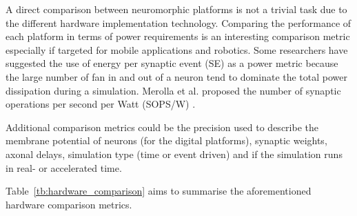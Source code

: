 A direct comparison between neuromorphic platforms is not a trivial task due to the different hardware implementation technology. Comparing the performance of each platform in terms of power requirements is an interesting comparison metric especially if targeted for mobile applications and robotics. Some researchers have suggested the use of energy per synaptic event (SE) \citep{Sharp2012110,strometal} as a power metric because the large number of fan in and out of a neuron tend to dominate the total power dissipation during a simulation. Merolla et al. proposed the number of synaptic operations per second per Watt (SOPS/W) \citep{Merolla08082014}. 

Additional comparison metrics could be the precision used to describe the membrane potential of neurons (for the digital platforms), synaptic weights, axonal delays, simulation type (time or event driven) and if the simulation runs in real- or accelerated time.
 
Table~\ref{tb:hardware_comparison} aims to summarise the aforementioned hardware comparison metrics.
 




%
%
%
%
%
%

